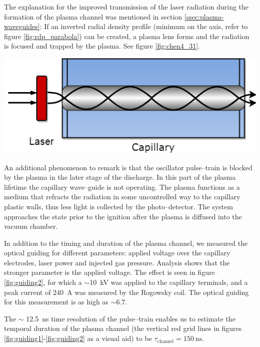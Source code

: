 \documentclass[../main.tex]{subfiles}
\begin{document}
The explanation for the improved transmission of the laser radiation during the formation of the plasma channel was mentioned in section \ref{ssec:plasma-waveguides}: If an inverted radial density profile (minimum on the axis, refer to figure \ref{fig:rdp_parabola}) can be created, a plasma lens forms and the radiation is focused and trapped by the plasma. See figure \ref{fig:chen4_31}.
\begin{marginfigure}
\includegraphics[width=\marginparwidth]{figures/chen4_31.png}
\caption{Plasma confined inside the capillary will trap the \SI{800}{\nm} laser light only if the plasma has a density minimum on axis.}
\label{fig:chen4_31}
\end{marginfigure}

An additional phenomenon to remark is that the oscillator pulse--train is blocked by the plasma in the later stage of the discharge. In this part of the plasma lifetime the capillary wave--guide is not operating. The plasma functions as a medium that refracts the radiation in some uncontrolled way to the capillary plastic walls, thus less light is collected by the photo--detector. The system approaches the state prior to the ignition after the plasma is diffused into the vacuum chamber.

In addition to the timing and duration of the plasma channel, we measured the optical guiding for different parameters: applied voltage over the capillary electrodes, laser power and injected gas pressure. Analysis shows that the stronger parameter is the applied voltage. The effect is seen in figure \ref{fig:guiding2}, for which a $\sim$\SI{10}{\kilo\volt} was applied to the capillary terminals, and a peak current of \SI{240}{\A} was measured by the Rogowsky coil. The optical guiding for this measurement is as high as $\sim 6.7$.

The $\sim$ \SI{12.5}{\ns} time resolution of the pulse--train enables us to estimate the temporal duration of the plasma channel (the vertical red grid lines in figures \ref{fig:guiding1}-\ref{fig:guiding2} as a visual aid) to be $\tau_\text{channel}=\SI{150}{\ns}$.
\end{document}
